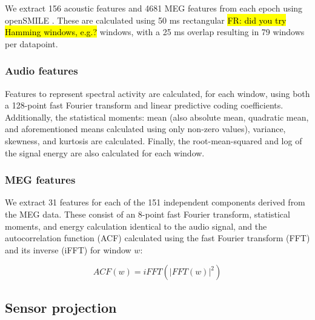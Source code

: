 \documentclass[utf8]{frontiersSCNS} %
\newcommand{\FR}[1]{{\small \textcolor{red}{\hl{FR: #1}}}}
\begin{document}
We extract 156 acoustic features and 4681 MEG features from each epoch using openSMILE \cite{Eyben13-RDI}. These are calculated using 50 ms rectangular \FR{did you try Hamming windows, e.g.?} windows, with a 25 ms overlap resulting in 79 windows per datapoint.

\subsubsection{Audio features}

Features to represent spectral activity are calculated, for each window, using both a 128-point fast Fourier transform and linear predictive coding coefficients. Additionally, the statistical moments: mean (also absolute mean, quadratic mean, and aforementioned means calculated using only non-zero values), variance, skewness, and kurtosis are calculated. Finally, the root-mean-squared and log of the signal energy are also calculated for each window.

\subsubsection{MEG features}

We extract 31 features for each of the 151 independent components derived from the MEG data. These consist of an 8-point fast Fourier transform, statistical moments, and energy calculation identical to the audio signal, and the autocorrelation function (ACF) calculated using the fast Fourier transform (FFT) and its inverse (iFFT) for window $w$:


\begin{equation}
  ACF(w) = iFFT(|FFT(w)|^2)
  \label{eq1}
\end{equation}

\subsection{Sensor projection}\label{sec:sens_proj}
\end{document}
